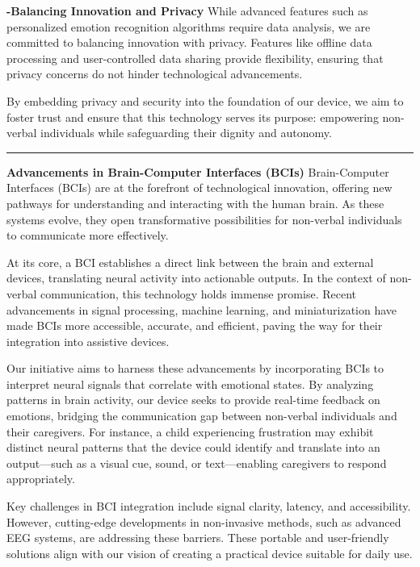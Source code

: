\documentclass[12pt, research paper]{report}
\begin{document}
	\noindent \textbf{-Balancing Innovation and Privacy}
	\newline While advanced features such as personalized emotion recognition algorithms require data analysis, we are committed to balancing innovation with privacy. Features like offline data processing and user-controlled data sharing provide flexibility, ensuring that privacy concerns do not hinder technological advancements.
	\bigskip 
	
	\noindent By embedding privacy and security into the foundation of our device, we aim to foster trust and ensure that this technology serves its purpose: empowering non-verbal individuals while safeguarding their dignity and autonomy.
	
	\noindent \rule{13.85cm}{0.01cm}
	\textbf{Advancements in Brain-Computer Interfaces (BCIs)}
	\newline Brain-Computer Interfaces (BCIs) are at the forefront of technological innovation, offering new pathways for understanding and interacting with the human brain. As these systems evolve, they open transformative possibilities for non-verbal individuals to communicate more effectively.
	\bigskip 
	
	\noindent At its core, a BCI establishes a direct link between the brain and external devices, translating neural activity into actionable outputs. In the context of non-verbal communication, this technology holds immense promise. Recent advancements in signal processing, machine learning, and miniaturization have made BCIs more accessible, accurate, and efficient, paving the way for their integration into assistive devices.
	\bigskip 
	
	\noindent Our initiative aims to harness these advancements by incorporating BCIs to interpret neural signals that correlate with emotional states. By analyzing patterns in brain activity, our device seeks to provide real-time feedback on emotions, bridging the communication gap between non-verbal individuals and their caregivers. For instance, a child experiencing frustration may exhibit distinct neural patterns that the device could identify and translate into an output—such as a visual cue, sound, or text—enabling caregivers to respond appropriately.
	\bigskip 
	
	\noindent Key challenges in BCI integration include signal clarity, latency, and accessibility. However, cutting-edge developments in non-invasive methods, such as advanced EEG systems, are addressing these barriers. These portable and user-friendly solutions align with our vision of creating a practical device suitable for daily use.
	\bigskip 
	
\end{document}
